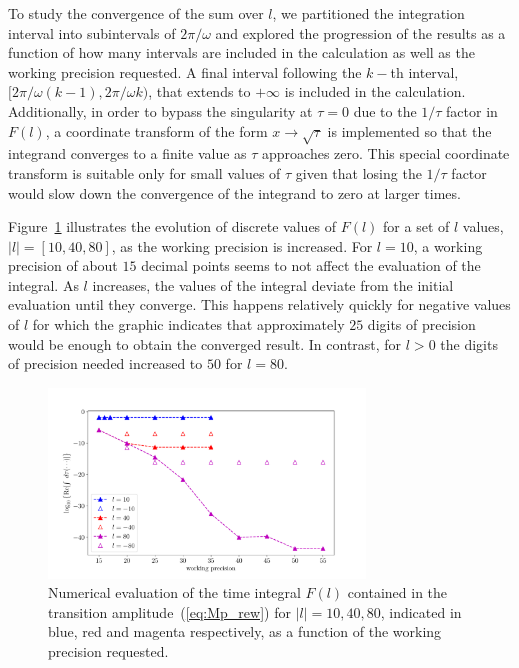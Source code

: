 To study the convergence of the sum over $l$, we partitioned the
integration interval into subintervals of $2\pi/\omega$ and explored
the progression of the results as a function of how many intervals are
included in the calculation as well as the working precision
requested. A final interval following the $k-$th interval,
$[2\pi/\omega (k-1), 2\pi/\omega k)$, that extends to $+\infty$ is
  included in the calculation. Additionally, in order to bypass the
  singularity at $\tau = 0$ due to the $1/\tau$ factor in $F(l)$, a
  coordinate transform of the form $x \to \sqrt{\tau}$ is implemented
  so that the integrand converges to a finite value as $\tau$
  approaches zero. This special coordinate transform is suitable only
  for small values of $\tau$ given that losing the $1/\tau$ factor
  would slow down the convergence of the integrand to zero at larger
  times.



Figure~\ref{fig:WP_convergence} illustrates the evolution of discrete
values of $F(l)$ for a set of $l$ values, $|l| = [10, 40, 80]$, as the
working precision is increased. For $l=10$, a working precision of
about $15$ decimal points seems to not affect the evaluation of the
integral. As $l$ increases, the values of the integral deviate from
the initial evaluation until they converge. This happens relatively
quickly for negative values of $l$ for which the graphic indicates
that approximately $25$ digits of precision would be enough to obtain
the converged result. In contrast, for $l>0$ the digits of precision
needed increased to $50$ for $l = 80$.

\begin{figure}
  \centering
  \includegraphics[width=0.75\textwidth]{figures/ch_ATI_SFA/He/n512PG25MR35l_pm104080logRe}
  \caption{Numerical evaluation of the time integral $F(l)$ contained
    in the transition amplitude~(\ref{eq:Mp_rew}) for $|l| = 10, 40,
    80$, indicated in blue, red and magenta respectively, as a
    function of the working precision requested.}
  \label{fig:WP_convergence}
\end{figure}


